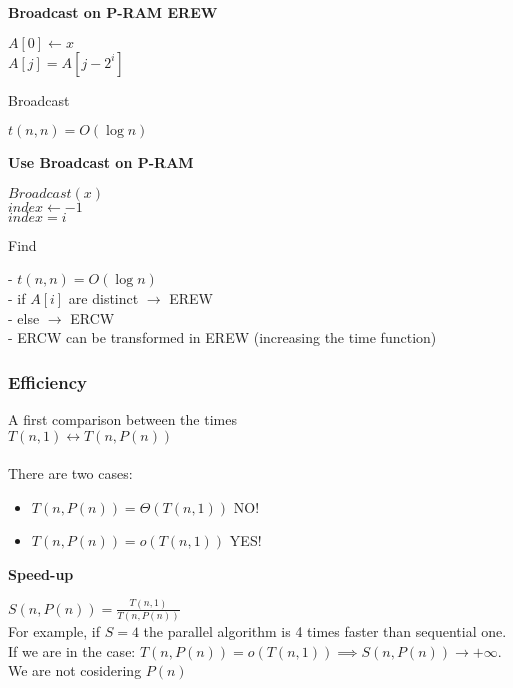 \textbf{Broadcast on P-RAM EREW}

\begin{algorithm}[H]
 \SetAlgoLined
 $A[0] \gets x$\\
  {
   { 
   $A[j] = A[j-2^{i}]$ 
  }
 } 
 \caption{Broadcast}
\end{algorithm}

$t(n, n) = O(\log{n})$

\textbf{Use Broadcast on P-RAM}

\begin{algorithm}[H]
 \SetAlgoLined
 \KwResult{}
 $Broadcast(x)$\\
 $index \gets -1$\\
  {
   { 
   $index = i$ 
  }
 } 
 \caption{Find}
\end{algorithm}

- $t(n, n) = O(\log{n})$\\
- if $A[i]$ are distinct $\rightarrow$ EREW\\
- else $\rightarrow$ ERCW\\
- ERCW can be transformed in EREW (increasing the time function)

\subsubsection{Efficiency}

A first comparison between the times\\
$T(n,1) 	\leftrightarrow T(n, P(n))$\\ \\
There are two cases:
\begin{itemize}
 \item $T(n, P(n)) = \Theta(T(n,1))$ NO!
 \item $T(n, P(n)) = o(T(n,1))$ YES!
\end{itemize}

\textbf{Speed-up}

$S(n, P(n)) = \frac{T(n,1)}{T(n, P(n))}$\\
For example, if $S = 4$ the parallel algorithm is 4 times faster than sequential one.\\
If we are in the case: $T(n, P(n)) = o(T(n,1)) \implies S(n, P(n)) \rightarrow +\infty$. We are not cosidering $P(n)$\\

